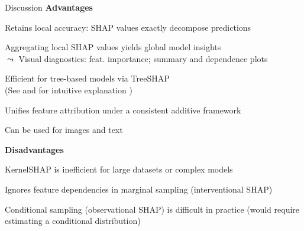 \documentclass[10pt,compress,t,notes=noshow, xcolor=table]{beamer}
\begin{document}
\begin{framev}[align=top]{Discussion}
\textbf{Advantages}
\begin{itemizeM}
\item Retains local accuracy: SHAP values exactly decompose predictions
\item Aggregating local SHAP values yields global model insights\\
$\leadsto$ Visual diagnostics: feat. importance; summary and dependence plots
\item Efficient for tree-based models via TreeSHAP\\
(See  and for intuitive explanation )
\item Unifies feature attribution under a consistent additive framework
\item Can be used for images  and text 
\end{itemizeM}
\spacer[0.25]
\textbf{Disadvantages}
\begin{itemizeM}
\item KernelSHAP is inefficient for large datasets or complex models
\item Ignores feature dependencies in marginal sampling (interventional SHAP)
\item Conditional sampling (observational SHAP) is difficult in practice (would require estimating a conditional distribution)
\end{itemizeM}
\end{framev}

\endlecture
\end{document}
